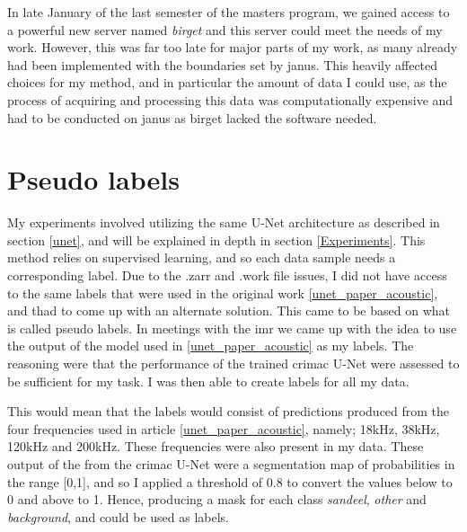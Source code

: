                 In late January of the last semester of the masters program, we gained access to a powerful new server named \textit{birget} and this server could meet the needs of my work. However, this was far too late for major parts of my work, as many already had been implemented with the boundaries set by janus. This heavily affected choices for my method, and in particular the amount of data I could use, as the process of acquiring and processing this data was computationally expensive and had to be conducted on janus as birget lacked the software needed.


    \section{Pseudo labels} \label{Pseudo label}
        My experiments involved utilizing the same U-Net architecture as described in section \ref{unet}, and will be explained in depth in section \ref{Experiments}. This method relies on supervised learning, and so each data sample needs a corresponding label. Due to the .zarr and .work file issues, I did not have access to the same labels that were used in the original work \ref{unet_paper_acoustic}, and thad to come up with an alternate solution. This came to be based on what is called pseudo labels. In meetings with the \gls{imr} we came up with the idea to use the output of the model used in \ref{unet_paper_acoustic} as my labels. The reasoning were that the performance of the trained \gls{crimac} U-Net were assessed to be sufficient for my task. I was then able to create labels for all my data.
        
        This would mean that the labels would consist of predictions produced from the four frequencies used in article \ref{unet_paper_acoustic}, namely; 18kHz, 38kHz, 120kHz and 200kHz. These frequencies were also present in my data. These output of the from the \gls{crimac} U-Net were a segmentation map of probabilities in the range [0,1], and so I applied a threshold of 0.8 to convert the values below to 0 and above to 1. Hence, producing a mask for each class \textit{sandeel}, \textit{other} and \textit{background}, and could be used as labels.
        
